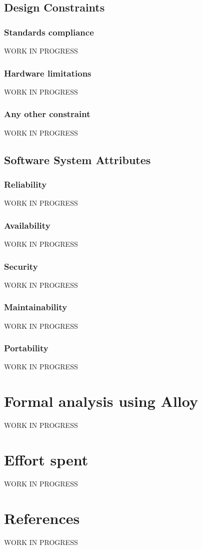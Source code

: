 \documentclass{report}
\begin{document}
		\section{Design Constraints}
			\subsection{Standards compliance}
			WORK IN PROGRESS
			\subsection{Hardware limitations}
			WORK IN PROGRESS
			\subsection{Any other constraint}
			WORK IN PROGRESS
		\section{Software System Attributes}
			\subsection{Reliability}
			WORK IN PROGRESS
			\subsection{Availability}
			WORK IN PROGRESS
			\subsection{Security}
			WORK IN PROGRESS
			\subsection{Maintainability}
			WORK IN PROGRESS
			\subsection{Portability}
			WORK IN PROGRESS
	\chapter{Formal analysis using Alloy}
	WORK IN PROGRESS
	\chapter{Effort spent}
	WORK IN PROGRESS
	\chapter{References}
	WORK IN PROGRESS
	
\end{document}

